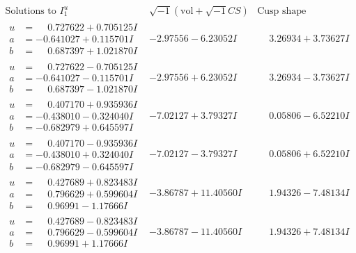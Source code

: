 \documentclass[1p]{elsarticle_modified}
\theoremstyle{definition}
\newcommand{\I}{\sqrt{-1}}
\begin{document}
$$\begin{array}{c|c|c}  
\text{Solutions to }I^u_{1}& \I (\text{vol} + \sqrt{-1}CS) & \text{Cusp shape}\\
 \hline 
\begin{aligned}
u &= \phantom{-}0.727622 + 0.705125 I \\
a &= -0.641027 + 0.115701 I \\
b &= \phantom{-}0.687397 + 1.021870 I\end{aligned}
 & -2.97556 - 6.23052 I & \phantom{-}3.26934 + 3.73627 I \\ \hline\begin{aligned}
u &= \phantom{-}0.727622 - 0.705125 I \\
a &= -0.641027 - 0.115701 I \\
b &= \phantom{-}0.687397 - 1.021870 I\end{aligned}
 & -2.97556 + 6.23052 I & \phantom{-}3.26934 - 3.73627 I \\ \hline\begin{aligned}
u &= \phantom{-}0.407170 + 0.935936 I \\
a &= -0.438010 - 0.324040 I \\
b &= -0.682979 + 0.645597 I\end{aligned}
 & -7.02127 + 3.79327 I & \phantom{-}0.05806 - 6.52210 I \\ \hline\begin{aligned}
u &= \phantom{-}0.407170 - 0.935936 I \\
a &= -0.438010 + 0.324040 I \\
b &= -0.682979 - 0.645597 I\end{aligned}
 & -7.02127 - 3.79327 I & \phantom{-}0.05806 + 6.52210 I \\ \hline\begin{aligned}
u &= \phantom{-}0.427689 + 0.823483 I \\
a &= \phantom{-}0.796629 + 0.599604 I \\
b &= \phantom{-}0.96991 - 1.17666 I\end{aligned}
 & -3.86787 + 11.40560 I & \phantom{-}1.94326 - 7.48134 I \\ \hline\begin{aligned}
u &= \phantom{-}0.427689 - 0.823483 I \\
a &= \phantom{-}0.796629 - 0.599604 I \\
b &= \phantom{-}0.96991 + 1.17666 I\end{aligned}
 & -3.86787 - 11.40560 I & \phantom{-}1.94326 + 7.48134 I \\ \hline\begin{aligned}

\end{aligned}
\end{array}$$
\end{document}
